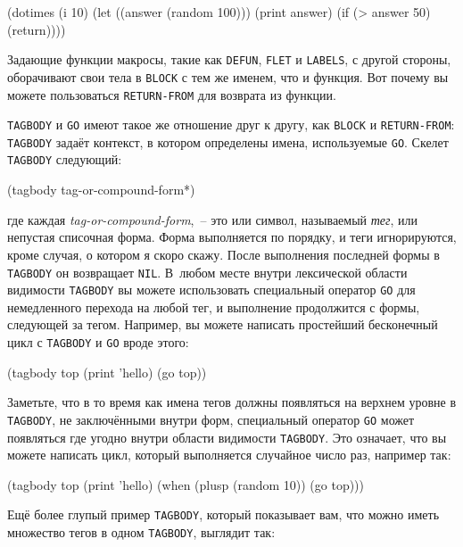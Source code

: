 \begin{myverb}
(dotimes (i 10)
  (let ((answer (random 100)))
    (print answer)
    (if (> answer 50) (return))))
\end{myverb}

Задающие функции макросы, такие как \lstinline{DEFUN}, \lstinline{FLET} и \lstinline{LABELS}, с другой
стороны, оборачивают свои тела в \lstinline{BLOCK} с тем же именем, что и функция. Вот почему
вы можете пользоваться \lstinline{RETURN-FROM} для возврата из функции.

\lstinline{TAGBODY} и \lstinline{GO} имеют такое же отношение друг к другу, как \lstinline{BLOCK} и
\lstinline{RETURN-FROM}: \lstinline{TAGBODY} задаёт контекст, в котором определены имена,
используемые \lstinline{GO}. Скелет \lstinline{TAGBODY} следующий:

\begin{myverb}
(tagbody
  tag-or-compound-form*)
\end{myverb}

\noindent{}где каждая \textit{tag-or-compound-form},~-- это или символ, называемый \textit{тег}, или
непустая списочная форма. Форма выполняется по порядку, и теги игнорируются, кроме случая,
о котором я скоро скажу. После выполнения последней формы в \lstinline{TAGBODY} он
возвращает \lstinline{NIL}. В~любом месте внутри лексической области видимости \lstinline{TAGBODY}
вы можете использовать специальный оператор \lstinline{GO} для немедленного перехода на любой
тег, и выполнение продолжится с формы, следующей за тегом. Например, вы можете написать
простейший бесконечный цикл с \lstinline{TAGBODY} и \lstinline{GO} вроде этого:

\begin{myverb}
(tagbody
 top
   (print 'hello)
   (go top))
\end{myverb}

Заметьте, что в то время как имена тегов должны появляться на верхнем уровне в
\lstinline{TAGBODY}, не заключёнными внутри форм, специальный оператор \lstinline{GO} может
появляться где угодно внутри области видимости \lstinline{TAGBODY}. Это означает, что вы можете
написать цикл, который выполняется случайное число раз, например так:

\begin{myverb}
(tagbody
 top
   (print 'hello)
   (when (plusp (random 10)) (go top)))
\end{myverb}

Ещё более глупый пример \lstinline{TAGBODY}, который показывает вам, что можно иметь множество
тегов в одном \lstinline{TAGBODY}, выглядит так:

